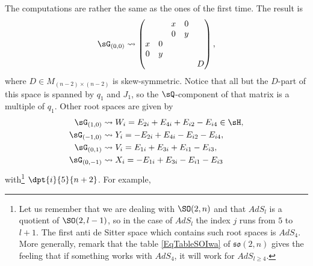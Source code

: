 The computations are rather the same as the ones of the first time. The result is\label{pg:root_n}
\begin{equation}
\sG_{(0,0)}\leadsto
\begin{pmatrix}
&&x&0\\
&&0&y\\
x&0\\
0&y\\
&&&& D
\end{pmatrix},
\end{equation}
where $D\in M_{(n-2)\times(n-2)}$ is skew-symmetric. Notice that all but the $D$-part of this space is spanned by $q_1$ and $J_1$, so the $\sQ$-component of that matrix is a multiple of $q_1$. Other root spaces are given by
\begin{subequations}
\begin{align}
\sG_{(1,0)}&\leadsto W_i=E_{2i}+E_{4i}+E_{i2}-E_{i4}\in\sH,\\
\sG_{(-1,0)}&\leadsto Y_i=-E_{2i}+E_{4i}-E_{i2}-E_{i4},\\
\sG_{(0,1)}&\leadsto V_i=E_{1i}+E_{3i}+E_{i1}-E_{i3},\\
\sG_{(0,-1)}&\leadsto X_i=-E_{1i}+E_{3i}-E_{i1}-E_{i3}
\end{align}
\end{subequations}
with\footnote{Let us remember that we are dealing with $\SO(2,n)$ and that $AdS_{l}$ is a quotient of $\SO(2,l-1)$, so in the case of $AdS_{l}$ the index $j$ runs from $5$ to $l+1$. The first anti de Sitter space which contains such root spaces is $AdS_{4}$. More generally, remark that the table \eqref{EqTableSOIwa} of $\mathfrak{so}(2,n)$ gives the feeling that if something works with $AdS_4$, it will work for $AdS_{l\geq 4}$.} $\dpt{i}{5}{n+2}$. For example,
